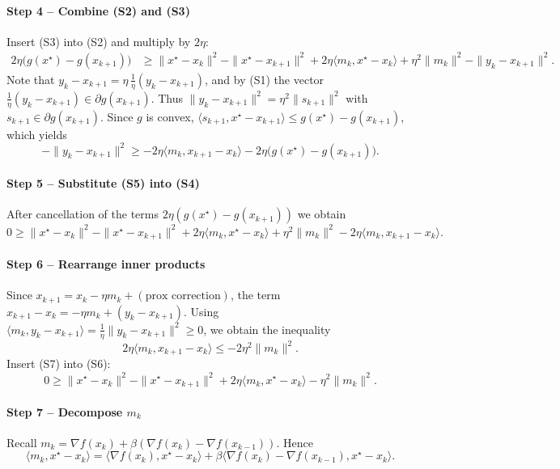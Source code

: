 \documentclass{article}
\newcommand{\inner}[2]{\langle #1,#2\rangle}
\newcommand{\norm}[1]{\|#1\|}
\begin{document}
\paragraph{Step 4 – Combine (S2) and (S3)}
Insert (S3) into (S2) and multiply by $2\eta$:
\begin{align}
2\eta\bigl(g(x^{\star})-g(x_{k+1})\bigr)
&\ge \norm{x^{\star}-x_{k}}^{2}
- \norm{x^{\star}-x_{k+1}}^{2}
+2\eta\inner{m_{k}}{x^{\star}-x_{k}}
+\eta^{2}\norm{m_{k}}^{2}
-\norm{y_{k}-x_{k+1}}^{2}.
\tag{S4}
\end{align}
Note that $y_{k}-x_{k+1}= \eta\,\frac{1}{\eta}(y_{k}-x_{k+1})$,
and by (S1) the vector $\frac{1}{\eta}(y_{k}-x_{k+1})\in\partial g(x_{k+1})$.
Thus $\norm{y_{k}-x_{k+1}}^{2}= \eta^{2}\norm{s_{k+1}}^{2}$ with $s_{k+1}\in\partial g(x_{k+1})$.
Since $g$ is convex, $ \inner{s_{k+1}}{x^{\star}-x_{k+1}}\le g(x^{\star})-g(x_{k+1})$,
which yields
\[
-\norm{y_{k}-x_{k+1}}^{2}\ge -2\eta\inner{m_{k}}{x_{k+1}-x_{k}}
-2\eta\bigl(g(x^{\star})-g(x_{k+1})\bigr).
\tag{S5}
\]

\paragraph{Step 5 – Substitute (S5) into (S4)}
After cancellation of the terms $2\eta(g(x^{\star})-g(x_{k+1}))$ we obtain
\[
0\ge \norm{x^{\star}-x_{k}}^{2}
- \norm{x^{\star}-x_{k+1}}^{2}
+2\eta\inner{m_{k}}{x^{\star}-x_{k}}
+\eta^{2}\norm{m_{k}}^{2}
-2\eta\inner{m_{k}}{x_{k+1}-x_{k}}.
\tag{S6}
\]

\paragraph{Step 6 – Rearrange inner products}
Since $x_{k+1}=x_{k}-\eta m_{k}+(\text{prox correction})$,
the term $x_{k+1}-x_{k}= -\eta m_{k}+ (y_{k}-x_{k+1})$.
Using $ \inner{m_{k}}{y_{k}-x_{k+1}} = \frac1\eta \norm{y_{k}-x_{k+1}}^{2}\ge0$,
we obtain the inequality
\[
2\eta\inner{m_{k}}{x_{k+1}-x_{k}}\le -2\eta^{2}\norm{m_{k}}^{2}.
\tag{S7}
\]
Insert (S7) into (S6):
\[
0\ge \norm{x^{\star}-x_{k}}^{2}
- \norm{x^{\star}-x_{k+1}}^{2}
+2\eta\inner{m_{k}}{x^{\star}-x_{k}}
- \eta^{2}\norm{m_{k}}^{2}.
\tag{S8}
\]

\paragraph{Step 7 – Decompose $m_{k}$}
Recall $m_{k}= \nabla f(x_{k})+\beta(\nabla f(x_{k})-\nabla f(x_{k-1}))$.
Hence
\[
\inner{m_{k}}{x^{\star}-x_{k}}
= \inner{\nabla f(x_{k})}{x^{\star}-x_{k}}
+ \beta\inner{\nabla f(x_{k})-\nabla f(x_{k-1})}{x^{\star}-x_{k}}.
\tag{S9}
\]
\end{document}
